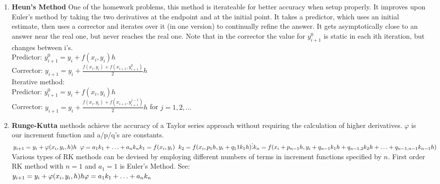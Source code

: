 \documentclass[fontsize=5pt]{scrartcl}
\begin{document}
\begin{multicols}{3}
\begin{enumerate}
          \item \textbf{Heun's Method} One of the homework problems, this method is iterateable for better accuracy
            when setup properly. It improves upon Euler's method by taking the two derivatives at the endpoint and
            at the initial point. It takes a predictor, which uses an initial estimate, then uses a corrector and iterates over it
            (in one version) to continually refine the answer. It gets asymptotically close to an answer near the real one, but never
            reaches the real one. Note that in the corrector the value for $y_{i+1}^0$ is static in each ith iteration, but changes between
            i's.\\
            Predictor: $y^0_{i+1}=y_i+f(x_i,y_i)h$\\
            Corrector: $y_{i+1}=y_i+\frac{f(x_i,y_i)+f(x_{i+1},y^0_{i+1})}{2}h$ \\
            Iterative method: \\
            Predictor: $y^0_{i+1}=y_i+f(x_i,y_i)h$\\
            Corrector: $y_{i+1}=y_i+\frac{f(x_i,y_i)+f(x_{i+1},y^{j-1}_{i+1})}{2}h$ for $j=1,2,...$ \\
         \item \textbf{Runge-Kutta} methods achieve the accuracy of a Taylor series approach without requiring the calculation of higher derivatives.
           $\varphi$ is our increment function and a/p/q's are constants. \\
         \begin{math}
           y_{i+1}=y_i+\varphi(x_i,y_i,h)h \hspace{2mm} \varphi=a_1k_1+\ldots+a_nk_n\\
           k_1=f(x_i,y_i) \hspace{2mm} k_2=f(x_i,p_1h,y_i+q_11k_1h)\\
           \vdots\\
           k_n=f(x_i+p_{n-1}h,y_i+q_{n-1}k_1h+q_{n-1,2}k_2h+\ldots+q_{n-1,n-1}k_{n-1}h)\\
         \end{math}\\
         Various types of RK methods can be devised by employing different numbers of terms in increment functions specified by $n$. First order RK method
          with $n=1$ and $a_1=1$ is Euler's Method. See:\\
         \begin{math}
           y_{i+1}=y_i+\varphi(x_i,y_i,h)h\vspace{2mm}\varphi=a_1k_1+\ldots+a_nk_n\\

\end{math}
\end{enumerate}
\end{multicols}
\end{document}
